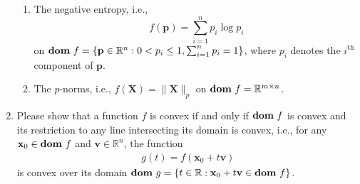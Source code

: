 \documentclass[11pt,letter,notitlepage]{article}
\DeclareMathOperator*{\dom}{\bf dom\,}
\begin{document}
\begin{exercise}
\begin{enumerate}
\begin{enumerate}
            \item
            The negative entropy, i.e.,
            $$
            f(\mathbf{p})=\sum_{i=1}^n p_i\log p_i
            $$
            on $\dom f=\{ \mathbf{p}\in\mathbb{R}^n:0<p_i\le 1, \sum_{i=1}^n p_i=1\}$, where $p_i$ denotes the $i^{\text{th}}$ component of $\mathbf{p}$.

            \item
            The $p$-norms, i.e., $ f(\mathbf{X})=\|\mathbf{X}\|_{p}$ on $\dom f=\mathbb{R}^{m\times n}$.


        \end{enumerate}

    \item 
    Please show that a function $f$ is convex if and only if $\dom f$ is convex and its restriction to any line intersecting its domain is convex, i.e., for any $\mathbf{x}_{0} \in \dom f$ and $\mathbf{v} \in \mathbb{R}^{n}$, the function
    \begin{align*}
        g(t) = f(\mathbf{x}_{0} + t \mathbf{v})
    \end{align*}
    is convex over its domain $\dom g = \{t \in \mathbb{R}:\mathbf{x}_{0} + t \mathbf{v} \in \dom f \}$.
    

\end{enumerate}
\end{exercise}
\end{document}
